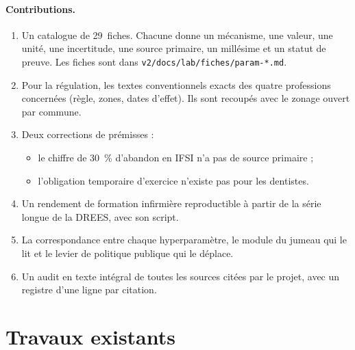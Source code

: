 \paragraph{Contributions.}
\begin{enumerate}
\item Un catalogue de 29~fiches. Chacune donne un mécanisme, une valeur,
  une unité, une incertitude, une source primaire, un millésime et un statut
  de preuve. Les fiches sont dans \texttt{v2/docs/lab/fiches/param-*.md}.
\item Pour la régulation, les textes conventionnels exacts des quatre
  professions concernées (règle, zones, dates d'effet). Ils sont recoupés
  avec le zonage ouvert par commune.
\item Deux corrections de prémisses :
  \begin{itemize}
  \item le chiffre de 30~\% d'abandon en IFSI n'a pas de source primaire ;
  \item l'obligation temporaire d'exercice n'existe pas pour les dentistes.
  \end{itemize}
\item Un rendement de formation infirmière reproductible à partir de la
  série longue de la DREES, avec son script.
\item La correspondance entre chaque hyperparamètre, le module du jumeau qui
  le lit et le levier de politique publique qui le déplace.
\item Un audit en texte intégral de toutes les sources citées par le
  projet, avec un registre d'une ligne par citation.
\end{enumerate}

\section{Travaux existants}

